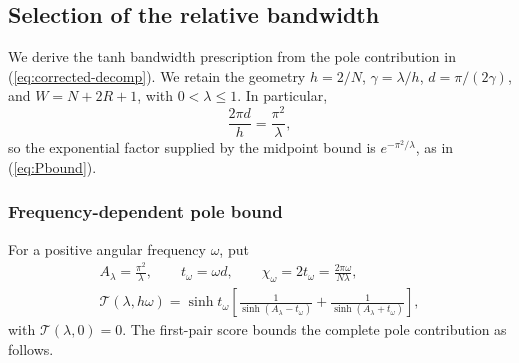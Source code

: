 \providecommand{\qeqref}[1]{(\ref{#1})}
\providecommand{\BandwidthFigurePath}{figures/bandwidth_appendix_figure.pdf}

\subsection{Selection of the relative bandwidth}
\label{sec:qi-bandwidth}

We derive the tanh bandwidth prescription from the pole contribution in
\qeqref{eq:corrected-decomp}. We retain the geometry
$h=2/N$, $\gamma=\lambda/h$, $d=\pi/(2\gamma)$, and
$W=N+2R+1$, with $0<\lambda\le1$. In particular,
\begin{equation}
 \frac{2\pi d}{h}=\frac{\pi^2}{\lambda},
 \label{eq:bandwidth-exponent}
\end{equation}
so the exponential factor supplied by the midpoint bound is
$e^{-\pi^2/\lambda}$, as in \qeqref{eq:Pbound}.

\subsubsection{Frequency-dependent pole bound}
For a positive angular frequency $\omega$, put
\begin{equation}
 \begin{gathered}
 A_\lambda=\frac{\pi^2}{\lambda},\qquad
 t_\omega=\omega d,\qquad
 \chi_\omega=2t_\omega=\frac{2\pi\omega}{N\lambda},\\
 \mathcal T(\lambda,h\omega)=\sinh t_\omega
 \left[\frac1{\sinh(A_\lambda-t_\omega)}
       +\frac1{\sinh(A_\lambda+t_\omega)}\right],
 \end{gathered}
 \label{eq:bandwidth-pair}
\end{equation}
with $\mathcal T(\lambda,0)=0$. The first-pair score bounds the complete
pole contribution as follows.

